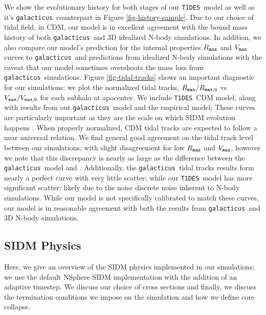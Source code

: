 \documentclass[%
 reprint,
 amsmath,
 amssymb,
 aps,
]{revtex4-2}
\def\gal{{\tt galacticus}~}
\def\tides{{\tt T1DES}~}
\newcommand{\reffig}[1]{Figure \ref{#1}}
\newcommand{\refappendix}[1]{Appendix \ref{#1}}
\begin{document}
We show the evolutionary history for both stages of our \tides model as well as it's \gal counterpart in \reffig{fig-history-sample}.
Due to our choice of tidal field, in CDM, our model is in excellent agreement with the bound mass history of both \gal and 3D idealized N-body simulations. 
In addition, we also compare our model's prediction for the internal properties $R_{\tt max}$ and $V_{\tt max}$ curves to \gal and predictions from idealized N-body simulations with the caveat that our model sometimes overshoots the mass loss from \gal simulations.
\reffig{fig-tidal-tracks} shows an important diagnostic for our simulations: we plot the normalized tidal tracks, $R_{\tt max} / R_{\tt max,0}$ vs $V_{\tt max} / V_{\tt max,0}$ for each subhalo at apocenter. 
We include \tides CDM model, along with results from out \gal model and the empirical \citet{errani2021asymptotic} model; 
These curves are particularly important as they are the scale on which SIDM evolution happens \cite{yang2024parametric}.
When properly normalized, CDM tidal tracks are expected to follow a near universal relation.
We find general good agreement on the tidal track level between our simulations; with slight disagreement for low $R_{\tt max}$ and $V_{\tt max}$, however we note that this discrepancy is nearly as large as the difference between the \gal model and \citet{errani2021asymptotic}.
Additionally, the \gal tidal tracks results form nearly a perfect curve with very little scatter; while our \tides model has more significant scatter: likely due to the noise discrete noise inherent to N-body simulations.
While our model is not specifically calibrated to match these curves, our model is in reasonable agreement with both the results from \gal and 3D N-body simulations.

\subsection{SIDM Physics}\label{sec-sidm}
Here, we give an overview of the SIDM physics implemented in our simulations; we use the default NSphere SIDM implementation with the addition of an adaptive timestep. We discuss our choice of cross sections and finally, we discuss the termination conditions we impose on the simulation and how we define core collapse.
\end{document}
